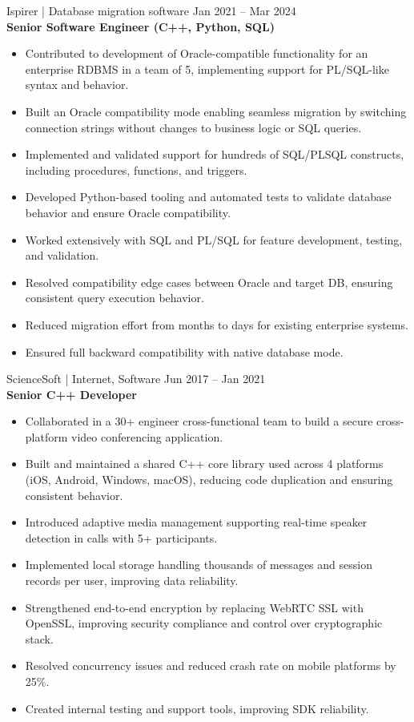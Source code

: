 \documentclass[10pt, a4paper]{article}
\newcommand{\roleentry}[3]{%
    \vspace{8pt}%
    {\normalsize #1 \hfill {\small\color{graytext}#3}}\\[1pt]%
    {\textbf{#2}}%
    \vspace{1pt}%
}
\begin{document}
\roleentry{Ispirer | Database migration software}{Senior Software Engineer (C++, Python, SQL)}{Jan 2021 -- Mar 2024}
\begin{itemize}
    \item Contributed to development of Oracle-compatible functionality for an enterprise RDBMS in a team of 5, implementing support for PL/SQL-like syntax and behavior.
    \item Built an Oracle compatibility mode enabling seamless migration by switching connection strings without changes to business logic or SQL queries.
    \item Implemented and validated support for hundreds of SQL/PLSQL constructs, including procedures, functions, and triggers.
    \item Developed Python-based tooling and automated tests to validate database behavior and ensure Oracle compatibility.
    \item Worked extensively with SQL and PL/SQL for feature development, testing, and validation.
    \item Resolved compatibility edge cases between Oracle and target DB, ensuring consistent query execution behavior.
    \item Reduced migration effort from months to days for existing enterprise systems.
    \item Ensured full backward compatibility with native database mode.
\end{itemize}

\roleentry{ScienceSoft | Internet, Software}{Senior C++ Developer}{Jun 2017 -- Jan 2021}
\begin{itemize}
    \item Collaborated in a 30+ engineer cross-functional team to build a secure cross-platform video conferencing application.
    \item Built and maintained a shared C++ core library used across 4 platforms (iOS, Android, Windows, macOS), reducing code duplication and ensuring consistent behavior.
    \item Introduced adaptive media management supporting real-time speaker detection in calls with 5+ participants.
    \item Implemented local storage handling thousands of messages and session records per user, improving data reliability.
    \item Strengthened end-to-end encryption by replacing WebRTC SSL with OpenSSL, improving security compliance and control over cryptographic stack.
    \item Resolved concurrency issues and reduced crash rate on mobile platforms by 25\%.
    \item Created internal testing and support tools, improving SDK reliability.
\end{itemize}
\end{document}
